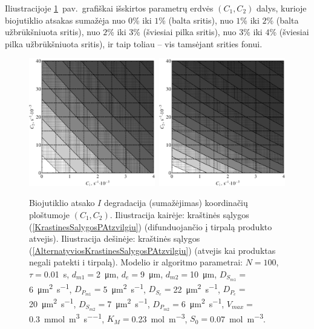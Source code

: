 \documentclass[a4paper,12pt]{article}
\begin{document}
Iliustracijoje \ref{pav02}~pav.\ grafiškai išskirtos parametrų erdvės $\left( C_1, C_2 \right)$ dalys, kurioje biojutiklio atsakas
sumažėja nuo $0$\% iki $1$\% (balta sritis), nuo $1$\% iki $2$\% (balta užbrūkšniuota sritis), nuo $2$\% iki $3$\% (šviesiai pilka sritis), nuo $3$\% iki $4$\% (šviesiai pilka užbrūkšniuota sritis), ir taip toliau -- vis tamsėjant srities fonui.

\begin{figure}[ht!]
    \centering
    \includegraphics[clip=true, width=0.49\textwidth]{figures/fig02a.pdf}\,
    \includegraphics[clip=true, width=0.49\textwidth]{figures/fig02b.pdf}
    \caption{Biojutiklio atsako $I$ degradacija (sumažėjimas) koordinačių ploštumoje $\left( C_1, C_2 \right)$.
    Iliustracija kairėje: kraštinės sąlygos (\ref{KrastinesSalygosPAtzvilgiu}) (difunduojančio į tirpalą produkto atvejis).
    Iliustracija dešinėje: kraštinės sąlygos (\ref{AlternatyviosKrastinesSalygosPAtzvilgiu}) (atvejis kai produktas negali patekti i tirpalą).
    Modelio ir algoritmo parametrai: $N = 100$, $\tau ={}$\SI{0.01}{\second},
    $d_{m1} ={}$\SI{2}{\micro\metre}, $d_e ={}$\SI{9}{\micro\metre}, $d_{m2} ={}$\SI{10}{\micro\metre},
    $D_{S_{m1}} ={}$\SI{6}{\micro\metre\squared\per\second}, $D_{P_{m1}} ={}$\SI{5}{\micro\metre\squared\per\second}, $D_{S_e} ={}$\SI{22}{\micro\metre\squared\per\second},
    $D_{P_e} ={}$\SI{20}{\micro\metre\squared\per\second}, $D_{S_{m2}} ={}$\SI{7}{\micro\metre\squared\per\second}, $D_{P_{m2}} ={}$\SI{6}{\micro\metre\squared\per\second},
    $V_{max} ={}$\SI{0.3}{\milli\mole\per\metre\cubed\per\second},
    $K_M ={}$\SI{0.23}{\mole\per\metre\cubed}, $S_0 ={}$\SI{0.07}{\mole\per\metre\cubed}.}
    \label{pav02}
\end{figure}
\end{document}
